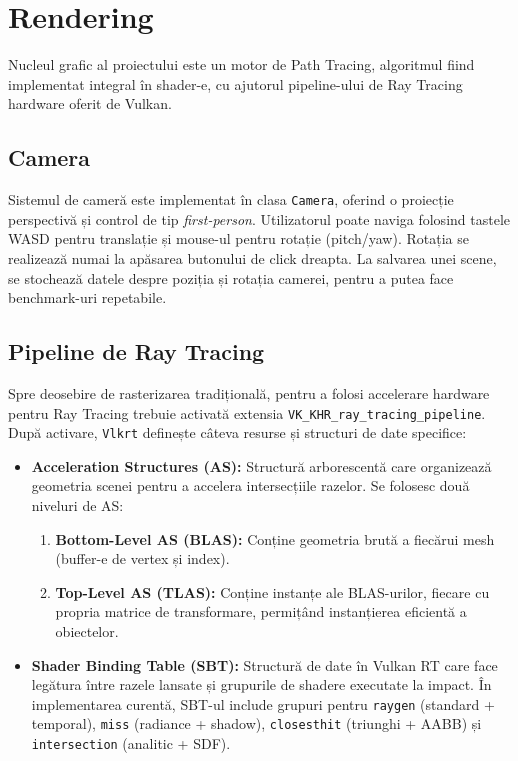 \documentclass[12pt,a4paper]{report}
\numberwithin{equation}{section} %
\begin{document}
\section{Rendering}\label{sec:rendering}

Nucleul grafic al proiectului este un motor de Path Tracing, algoritmul fiind implementat integral în shader-e, cu ajutorul pipeline-ului de Ray Tracing hardware oferit de Vulkan.

\subsection{Camera}

Sistemul de cameră este implementat în clasa \texttt{Camera}, oferind o proiecție perspectivă și control de tip \textit{first-person}.
Utilizatorul poate naviga folosind tastele WASD pentru translație și mouse-ul pentru rotație (pitch/yaw).
Rotația se realizează numai la apăsarea butonului de click dreapta.
La salvarea unei scene, se stochează datele despre poziția și rotația camerei, pentru a putea face benchmark-uri repetabile.

\subsection{Pipeline de Ray Tracing}\label{sec:pipeline}

Spre deosebire de rasterizarea tradițională, pentru a folosi accelerare hardware pentru Ray Tracing trebuie activată extensia \texttt{VK\_KHR\_ray\_tracing\_pipeline}.
După activare, \texttt{Vlkrt} definește câteva resurse și structuri de date specifice:
\begin{itemize}
    \item \textbf{Acceleration Structures (AS):} Structură arborescentă care organizează geometria scenei pentru a accelera intersecțiile razelor.
        Se folosesc două niveluri de AS:
        \begin{enumerate}
            \item \textbf{Bottom-Level AS (BLAS):} Conține geometria brută a fiecărui mesh (buffer-e de vertex și index).
            \item \textbf{Top-Level AS (TLAS):} Conține instanțe ale BLAS-urilor, fiecare cu propria matrice de transformare, permițând instanțierea eficientă a obiectelor.
        \end{enumerate}
    \item \textbf{Shader Binding Table (SBT):} Structură de date în Vulkan RT care face legătura între razele lansate și grupurile de shadere executate la impact.
        În implementarea curentă, SBT-ul include grupuri pentru \texttt{raygen} (standard + temporal), \texttt{miss} (radiance + shadow), \texttt{closesthit} (triunghi + AABB) și \texttt{intersection} (analitic + SDF).
\end{itemize}
\end{document}
